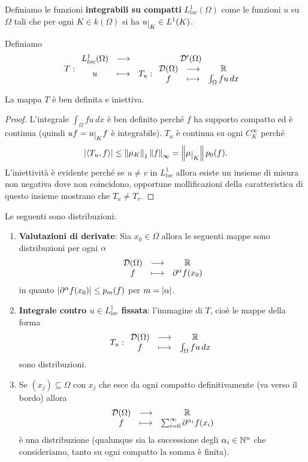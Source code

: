 \begin{definition}
Definiamo le funzioni \textbf{integrabili su compatti} $L^1_{loc}(\Omega)$ come le funzioni $u$ su $\Omega$ tali che per ogni $K\in k(\Omega)$ si ha $u\res K\in L^1(K)$.
\end{definition}


\begin{definition}
Definiamo
\[T:\begin{array}{ccc} {L^1_{loc}(\Omega)} & \longrightarrow & {\mathcal{D}'(\Omega)}\\ {u} & \longmapsto & {T_u:\begin{array}{ccc} {\mathcal{D}(\Omega)} & \longrightarrow & {\mathbb{R}}\\ {f} & \longmapsto & {\int_\Omega fu\,dx} \end{array}} \end{array}\]
\end{definition}

\begin{proposition}\label{PrInclusioneLocalmenteIntegrabiliInDistribuzioni}
La mappa $T$ \`e ben definita e iniettiva.
\end{proposition}
\begin{proof}
L'integrale $\int_\Omega fu\,dx$ \`e ben definito perch\'e $f$ ha supporto compatto ed \`e continua (quindi $uf=u\res K f$ \`e integrabile).
$T_u$ \`e continua su ogni $C^\infty_K$ perch\'e
\[\abs{\ps{T_u,f}}\leq\norm{\mu_K}_1\norm{f}_{\infty}=\norm{\mu\res K}p_0(f).\]
L'iniettivit\`a \`e evidente perch\'e se $u\neq v$ in $L^1_{loc}$ allora esiste un insieme di misura non negativa dove non coincidono, opportune mollificazioni della caratteristica di questo insieme mostrano che $T_u\neq T_v$.
\end{proof}

\begin{example}
Le seguenti sono distribuzioni:
\begin{enumerate}
\item \textbf{Valutazioni di derivate}: Sia $x_0\in\Omega$ allora le seguenti mappe sono distribuzioni per ogni $\alpha$
\[\begin{array}{ccc} {\mathcal{D}(\Omega)} & \longrightarrow & {\mathbb{R}}\\ {f} & \longmapsto & {\partial^\alpha f(x_0)} \end{array}\]
in quanto $\left|{\partial^\alpha f(x_0)}\right|\leq p_m(f)$ per $m=\left|{\alpha}\right|$.
\item \textbf{Integrale contro $u\in L_{loc}^1$ fissata}: l'immagine di $T$, cio\`e le mappe della forma
\[T_u:\begin{array}{ccc} {\mathcal{D}(\Omega)} & \longrightarrow & {\mathbb{R}}\\ {f} & \longmapsto & {\int_\Omega fu\,dx} \end{array}\]
sono distribuzioni.
\item Se $(x_j)\subseteq\Omega$ con $x_j$ che esce da ogni compatto definitivamente (va verso il bordo) allora
\[\begin{array}{ccc} {\mathcal{D}(\Omega)} & \longrightarrow & {\mathbb{R}}\\ {f} & \longmapsto & {\sum_{i=0}^\infty\partial^{\alpha_i} f(x_i)} \end{array}\]
\`e una distribuzione (qualunque sia la successione degli $\alpha_i\in\mathbb{N}^n$ che consideriamo, tanto su ogni compatto la somma \`e finita).
\end{enumerate}
\end{example}

